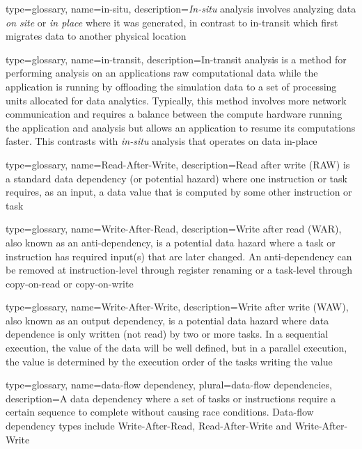 {
  type=glossary,
  name={in-situ},
  description={\textit{In-situ} analysis involves analyzing data \emph{on site} or \emph{in place} where it was generated, in contrast to \gls{in-transit} which first migrates data to another physical location}
}

{
  type=glossary,
  name={in-transit},
  description={In-transit analysis is a method for performing analysis on an applications raw computational data while the application is running by offloading the simulation data to a set of processing units allocated for data analytics. Typically, this method involves more network communication and requires a balance between the compute hardware running the application and analysis but allows an application to resume its computations faster. This contrasts with \textit{\gls{in-situ}} analysis that operates on data in-place}
}

{
  type=glossary,
  name={Read-After-Write},
  description={Read after write (\gls{RAW}) is a standard data dependency (or potential hazard) where one instruction or task requires, as an input, a data value that is computed by some other instruction or task}
}

{
  type=glossary,
  name={Write-After-Read},
  description={Write after read (\gls{WAR}), also known as an anti-dependency, is a potential data hazard where a task or instruction has required input(s) that are later changed. An anti-dependency can be removed at instruction-level through register renaming or a task-level through copy-on-read or copy-on-write}
}

{
  type=glossary,
  name={Write-After-Write},
  description={Write after write (\gls{WAW}), also known as an output
  dependency, is a potential data hazard where data dependence is only
  written (not read) by two or more tasks. In a sequential execution, the value
  of the data will be well defined, but in a parallel execution, the
  value is determined by the execution order of the tasks writing the
  value}
}

{
  type=glossary,
  name={data-flow dependency},
  plural={data-flow dependencies},
  description={A data dependency where a set of tasks or instructions require a certain sequence to complete without causing race conditions. Data-flow dependency types include \gls{Write-After-Read}, \gls{Read-After-Write} and \gls{Write-After-Write}}
}

